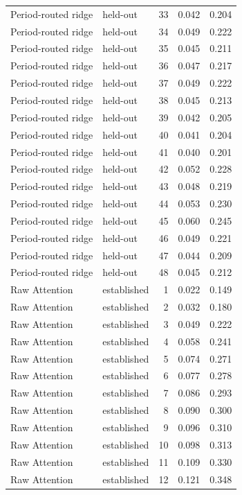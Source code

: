 \begin{tabular}{llrrr}
Period-routed ridge & held-out & 33 & 0.042 & 0.204 \\
Period-routed ridge & held-out & 34 & 0.049 & 0.222 \\
Period-routed ridge & held-out & 35 & 0.045 & 0.211 \\
Period-routed ridge & held-out & 36 & 0.047 & 0.217 \\
Period-routed ridge & held-out & 37 & 0.049 & 0.222 \\
Period-routed ridge & held-out & 38 & 0.045 & 0.213 \\
Period-routed ridge & held-out & 39 & 0.042 & 0.205 \\
Period-routed ridge & held-out & 40 & 0.041 & 0.204 \\
Period-routed ridge & held-out & 41 & 0.040 & 0.201 \\
Period-routed ridge & held-out & 42 & 0.052 & 0.228 \\
Period-routed ridge & held-out & 43 & 0.048 & 0.219 \\
Period-routed ridge & held-out & 44 & 0.053 & 0.230 \\
Period-routed ridge & held-out & 45 & 0.060 & 0.245 \\
Period-routed ridge & held-out & 46 & 0.049 & 0.221 \\
Period-routed ridge & held-out & 47 & 0.044 & 0.209 \\
Period-routed ridge & held-out & 48 & 0.045 & 0.212 \\
Raw Attention & established & 1 & 0.022 & 0.149 \\
Raw Attention & established & 2 & 0.032 & 0.180 \\
Raw Attention & established & 3 & 0.049 & 0.222 \\
Raw Attention & established & 4 & 0.058 & 0.241 \\
Raw Attention & established & 5 & 0.074 & 0.271 \\
Raw Attention & established & 6 & 0.077 & 0.278 \\
Raw Attention & established & 7 & 0.086 & 0.293 \\
Raw Attention & established & 8 & 0.090 & 0.300 \\
Raw Attention & established & 9 & 0.096 & 0.310 \\
Raw Attention & established & 10 & 0.098 & 0.313 \\
Raw Attention & established & 11 & 0.109 & 0.330 \\
Raw Attention & established & 12 & 0.121 & 0.348 \\

\end{tabular}
